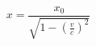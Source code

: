 \documentclass[11pt]{article}
\begin{document}
\thispagestyle{empty}
$$
x = \frac{x_0}{\sqrt{1-\left( \frac{v}{c} \right)^2}}
$$
\end{document}
